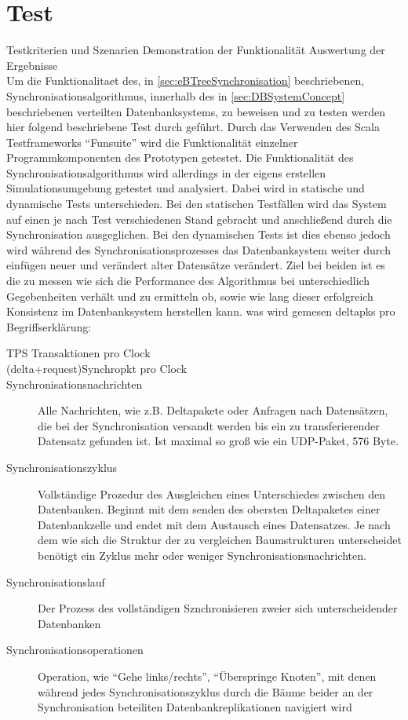 \documentclass[a4paper,11pt,oneside,%
headsepline,												%
footsepline,												%
bibtotocnumbered									%
]{scrreprt}
\begin{document}
\chapter{Test}

 Testkriterien und Szenarien
Demonstration der Funktionalität
Auswertung der Ergebnisse\\

Um die Funktionalitaet des, in \autoref{sec:eBTreeSynchronisation} beschriebenen, Synchronisationsalgorithmus, innerhalb des in \autoref{sec:DBSystemConcept}	beschriebenen verteilten Datenbanksystems, zu beweisen und zu testen werden hier folgend beschriebene Test durch geführt. Durch das Verwenden des Scala Testframeworks \enquote{Funsuite} wird die Funktionalität einzelner Programmkomponenten des Prototypen getestet. Die Funktionalität des Synchronisationsalgorithmus wird allerdings in der eigens erstellen Simulationsumgebung getestet und analysiert. Dabei wird in statische und dynamische Tests unterschieden. Bei den statischen Testfällen wird das System auf einen je nach Test verschiedenen Stand gebracht und anschließend durch die Synchronisation ausgeglichen. Bei den dynamischen Tests ist dies ebenso jedoch wird während des Synchronisationsprozesses das Datenbanksystem  weiter durch einfügen neuer und verändert alter Datensätze verändert. Ziel bei beiden ist es die zu messen wie sich die Performance des Algorithmus bei unterschiedlich Gegebenheiten verhält und zu ermitteln ob, sowie wie lang dieser erfolgreich Konsistenz im Datenbanksystem herstellen kann. was wird gemesen deltapks pro
Begriffserklärung:
\begin{description}
	\item[TPS Transaktionen pro Clock]
	\item[(delta+request)Synchropkt pro Clock	]
	\item[Synchronisationsnachrichten] Alle Nachrichten, wie  z.B. Deltapakete oder Anfragen nach Datensätzen, die bei der Synchronisation versandt werden bis ein zu transferierender Datensatz gefunden ist. Ist maximal so groß wie ein UDP-Paket, 576 Byte.
	\item[Synchronisationszyklus] Vollständige Prozedur des Ausgleichen eines Unterschiedes zwischen den Datenbanken. Beginnt mit dem senden des obersten Deltapaketes einer Datenbankzelle und endet mit dem Austausch eines Datensatzes. Je nach dem wie sich die Struktur der zu vergleichen Baumstrukturen unterscheidet benötigt ein Zyklus mehr oder weniger Synchronisationsnachrichten.
	\item[Synchronisationslauf] Der Prozess des vollständigen Sznchronisieren zweier sich unterscheidender Datenbanken
	\item[Synchronisationsoperationen] Operation, wie \enquote{Gehe links/rechts}, \enquote{Überspringe Knoten}, mit denen während jedes Synchronisationszyklus durch die Bäume beider an der Synchronisation beteiliten Datenbankreplikationen navigiert wird
\end{description}
\end{document}
